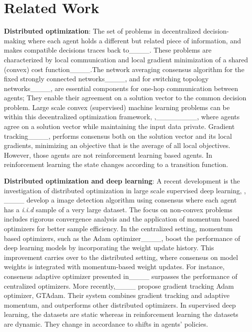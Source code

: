 \section{Related Work}
\textbf{Distributed optimization}: The set of problems in decentralized decision-making where each agent holds a different  but related piece of information, and makes compatible decisions traces back to____. These problems are characterized by local communication and local gradient minimization of a shared (convex) cost function____.The network averaging consensus algorithm for the fixed strongly connected networks____, and for switching topology networks____, are essential components for one-hop communication between agents; They enable their agreement on a solution vector to the common decision problem. Large scale convex (supervised) machine learning problems can be within this decentralized  optimization framework, \eg,________, where agents agree on a solution vector while maintaining the input data private. Gradient tracking____, performs consensus both on the solution vector and its local gradients, minimizing an objective that is the average of all local objectives. However, those agents are not reinforcement learning based agents. In reinforcement learning the state changes according to a transition function.

\textbf{Distributed optimization and deep learning}: A recent development is the investigation of distributed optimization in large scale supervised deep learning, \eg, ____ develop a image detection algorithm using consensus where each agent has a \textit{i.i.d} sample of a very large dataset. The focus on non-convex problems includes rigorous convergence analysis and the application of momentum based optimizers for better sample efficiency. In the centralized setting, momentum based optimizers, such as the Adam optimizer____, boost the performance of deep learning models by incorporating the weight update history. This improvement carries over to the distributed setting, where consensus on model weights is integrated with momentum-based weight updates. For instance, consensus adaptive optimizer presented in____ surpasses the performance of  centralized optimizers. More recently,____ propose gradient tracking Adam optimizer, GTAdam. Their system combines gradient tracking and adaptive momentum, and outperforms  other distributed optimizers. In supervised deep learning, the datasets are static whereas in reinforcement learning the datasets are dynamic. They change in accordance to shifts in agents' policies.

